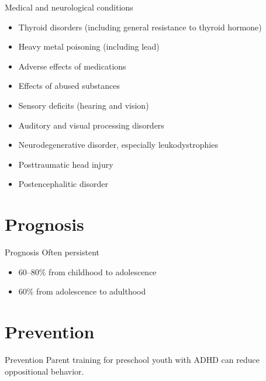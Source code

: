 \documentclass{beamer}
\begin{document}
\begin{frame}{Medical and neurological conditions}
\begin{itemize}
    \item Thyroid disorders (including general resistance to thyroid hormone)
    \item Heavy metal poisoning (including lead)
    \item Adverse effects of medications
    \item Effects of abused substances
    \item Sensory deficits (hearing and vision)
    \item Auditory and visual processing disorders
    \item Neurodegenerative disorder, especially leukodystrophies
    \item Posttraumatic head injury
    \item Postencephalitic disorder
\end{itemize}
\end{frame}

\section{Prognosis}
\begin{frame}{Prognosis}
Often persistent

\begin{itemize}
    \item 60--80\% from childhood to adolescence
    \item 60\% from adolescence to adulthood
\end{itemize}
\end{frame}

\section{Prevention}
\begin{frame}{Prevention}
Parent training for preschool youth with ADHD can reduce oppositional behavior.
\end{frame}
\end{document}
